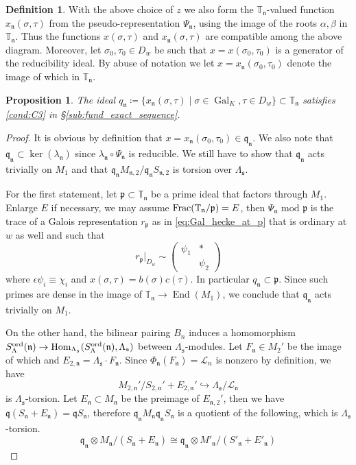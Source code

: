 \documentclass[leqno]{amsart}
\newtheorem{prop}[thm]{Proposition}
\theoremstyle{definition}
\newtheorem{defn}[thm]{Definition}
\theoremstyle{remark}
\newcommand{\smat}[1]{\left(\begin{smallmatrix} #1 \end{smallmatrix}\right)}
\DeclareMathOperator{\End}{End}
\DeclareMathOperator{\Hom}{Hom}
\DeclareMathOperator{\Gal}{Gal}
\newcommand{\fs}{\mathfrak{s}}
\newcommand{\fn}{\mathfrak{n}}
\newcommand{\fp}{\mathfrak{p}}
\newcommand{\fq}{\mathfrak{q}}
\newcommand{\TT}{\mathbb{T}} %
\newcommand{\ord}{\textnormal{ord}} %
\begin{document}
\begin{defn}
With the above choice of $z$
we also form the $\TT_\fn$-valued
function  $x_\fn(\sigma,\tau)$ 
from the pseudo-representation $\Psi_\fn$,
using the image of the roots  $\alpha,\beta$ in  $\TT_\fn$.
Thus the functions $x(\sigma,\tau)$
and  $x_\fn(\sigma,\tau)$ are compatible 
among the above diagram.
Moreover,
let $\sigma_0,\tau_0\in D_w$
be such that $ x=x(\sigma_0,\tau_0)$
is a generator of the reducibility ideal.
By abuse of notation we let
$x=x_\fn(\sigma_0,\tau_0)$
denote the image of which in $\TT_\fn$.
\end{defn}

\begin{prop}

The ideal 
$q_{\fn}\coloneqq
\{x_\fn(\sigma,\tau)\mid\sigma\in\Gal_K, \tau\in D_w\}
\subset \TT_\fn$
satisfies \ref{cond:C3}
in \S\ref{sub:fund_exact_sequence}.

\end{prop}

\begin{proof}

It is obvious by definition
that $x=x_\fn(\sigma_0,\tau_0)\in \fq_\fn$.
We also note that 
$\fq_\fn\subset\ker(\lambda_\fn)$
since  $\lambda_\fn\circ\Psi_\fn$ is reducible.
We still have to show that
$\fq_\fn$ acts trivially on  $M_1$
and that 
$\fq_\fn M_{\fn,2}/\fq_\fn S_{\fn,2}$
is torsion over $\Lambda_{\fs}$.

For the first statement,
let $\fp\subset \TT_\fn$
be a prime ideal that 
factors through  $M_1$. 
Enlarge $E$ if necessary,
we may assume  $\textnormal{Frac}(\TT_\fn/\fp)=E$,
then  $\Psi_\fn\text{ mod }\fp$
is the trace of a Galois representation  $r_{\fp}$
as in \eqref{eq:Gal_hecke_at_p}
that is ordinary at $w$ as well and such that
\[
	r_\fp\vert_{D_w}\sim
	\smat{\psi_1&*\\&\psi_2}
\]
where $\epsilon\psi_i\equiv \chi_i$
and $x(\sigma,\tau)=b(\sigma)c(\tau)$.
In particular $q_\fn\subset \fp$.
Since such primes are dense in the image
of $\TT_{\fn}\to \End(M_1)$,
we conclude that $\fq_{\fn}$ acts trivially on $M_1$.

On the other hand,
the bilinear pairing $B_n$ induces
a homomorphism 
$S^{\ord}_\Lambda(\fn)\to\Hom_{\Lambda_{\fs}}
(S^{\ord}_\Lambda(\fn),\Lambda_{\fs})$
between $\Lambda_{\fs}$-modules.
Let $F_\fn\in M_2'$ be the image of which
and $E_{2,\fn}=\Lambda_{\fs}\cdot F_\fn$.
Since  $\Phi_\fn(F_{\fn})=\mathcal{L}_n$ is nonzero 
by definition, we have
\[
	M_{2,\fn}'/S_{2,\fn}'+E_{2,\fn}'\hookrightarrow
	\Lambda_{\fs}/\mathcal{L}_{\fn}
\]
is $\Lambda_{\fs}$-torsion.
Let $E_{\fn}\subset M_{\fn}$ be the 
preimage of $E_{\fn,2}'$,
then we have $\fq(S_\fn+E_\fn)=\fq S_\fn$, 
therefore 
$\fq_{\fn}M_{\fn}\fq_{\fn}S_{\fn}$ is a quotient of
the following, which is $\Lambda_{\fs}$-torsion.
\[
	\fq_\fn\otimes 
	M_\fn/(S_\fn+E_\fn)\cong 
	\fq_{\fn}\otimes 
	M'_\fn/(S'_\fn+E'_\fn)
\]
\end{proof}
\end{document}
